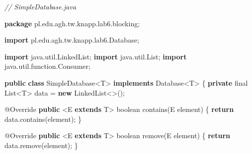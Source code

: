 \documentclass[11pt]{article}
\newenvironment{Shaded}{}{}
\newcommand{\KeywordTok}[1]{\textcolor[rgb]{0.00,0.44,0.13}{\textbf{{#1}}}}
\newcommand{\DataTypeTok}[1]{\textcolor[rgb]{0.56,0.13,0.00}{{#1}}}
\newcommand{\CommentTok}[1]{\textcolor[rgb]{0.38,0.63,0.69}{\textit{{#1}}}}
\newcommand{\FunctionTok}[1]{\textcolor[rgb]{0.02,0.16,0.49}{{#1}}}
\newcommand{\NormalTok}[1]{{#1}}
\newcommand{\ImportTok}[1]{{#1}}
\newcommand{\ControlFlowTok}[1]{\textcolor[rgb]{0.00,0.44,0.13}{\textbf{{#1}}}}
\newcommand{\OperatorTok}[1]{\textcolor[rgb]{0.40,0.40,0.40}{{#1}}}
\newcommand{\BuiltInTok}[1]{{#1}}
\newcommand{\AttributeTok}[1]{\textcolor[rgb]{0.49,0.56,0.16}{{#1}}}
\begin{document}
\begin{Shaded}
\begin{Highlighting}[]
\CommentTok{// SimpleDatabase.java}

\KeywordTok{package}\ImportTok{ pl}\OperatorTok{.}\ImportTok{edu}\OperatorTok{.}\ImportTok{agh}\OperatorTok{.}\ImportTok{tw}\OperatorTok{.}\ImportTok{knapp}\OperatorTok{.}\ImportTok{lab6}\OperatorTok{.}\ImportTok{blocking}\OperatorTok{;}

\KeywordTok{import} \ImportTok{pl}\OperatorTok{.}\ImportTok{edu}\OperatorTok{.}\ImportTok{agh}\OperatorTok{.}\ImportTok{tw}\OperatorTok{.}\ImportTok{knapp}\OperatorTok{.}\ImportTok{lab6}\OperatorTok{.}\ImportTok{Database}\OperatorTok{;}

\KeywordTok{import} \ImportTok{java}\OperatorTok{.}\ImportTok{util}\OperatorTok{.}\ImportTok{LinkedList}\OperatorTok{;}
\KeywordTok{import} \ImportTok{java}\OperatorTok{.}\ImportTok{util}\OperatorTok{.}\ImportTok{List}\OperatorTok{;}
\KeywordTok{import} \ImportTok{java}\OperatorTok{.}\ImportTok{util}\OperatorTok{.}\ImportTok{function}\OperatorTok{.}\ImportTok{Consumer}\OperatorTok{;}

\KeywordTok{public} \KeywordTok{class}\NormalTok{ SimpleDatabase}\OperatorTok{\textless{}}\NormalTok{T}\OperatorTok{\textgreater{}} \KeywordTok{implements}\NormalTok{ Database}\OperatorTok{\textless{}}\NormalTok{T}\OperatorTok{\textgreater{}} \OperatorTok{\{}
    \KeywordTok{private} \DataTypeTok{final} \BuiltInTok{List}\OperatorTok{\textless{}}\NormalTok{T}\OperatorTok{\textgreater{}}\NormalTok{ data }\OperatorTok{=} \KeywordTok{new} \BuiltInTok{LinkedList}\OperatorTok{\textless{}\textgreater{}();}

    \AttributeTok{@Override}
    \KeywordTok{public} \OperatorTok{\textless{}}\NormalTok{E }\KeywordTok{extends}\NormalTok{ T}\OperatorTok{\textgreater{}} \DataTypeTok{boolean} \FunctionTok{contains}\OperatorTok{(}\NormalTok{E element}\OperatorTok{)} \OperatorTok{\{}
        \ControlFlowTok{return}\NormalTok{ data}\OperatorTok{.}\FunctionTok{contains}\OperatorTok{(}\NormalTok{element}\OperatorTok{);}
    \OperatorTok{\}}

    \AttributeTok{@Override}
    \KeywordTok{public} \OperatorTok{\textless{}}\NormalTok{E }\KeywordTok{extends}\NormalTok{ T}\OperatorTok{\textgreater{}} \DataTypeTok{boolean} \FunctionTok{remove}\OperatorTok{(}\NormalTok{E element}\OperatorTok{)} \OperatorTok{\{}
        \ControlFlowTok{return}\NormalTok{ data}\OperatorTok{.}\FunctionTok{remove}\OperatorTok{(}\NormalTok{element}\OperatorTok{);}
    \OperatorTok{\}}


\end{Highlighting}
\end{Shaded}
\end{document}
